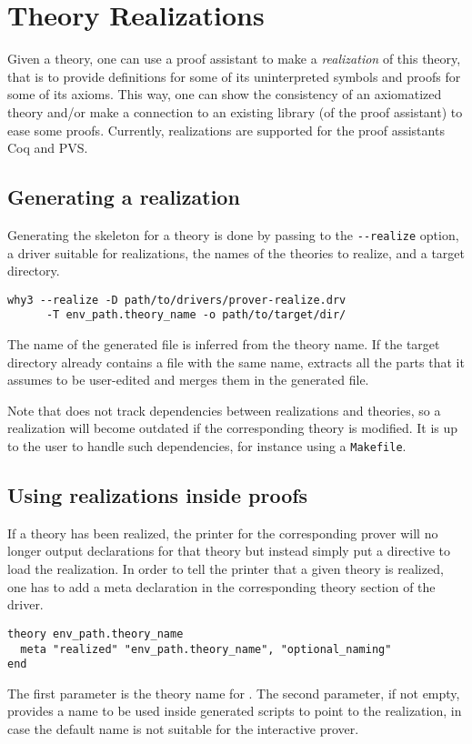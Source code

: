 \chapter{Theory Realizations}
\label{chap:realizations}

Given a \why theory, one can use a proof assistant to make a
\emph{realization} of this theory, that is to provide definitions for
some of its uninterpreted symbols and proofs for some of its
axioms. This way, one can show the consistency of an axiomatized
theory and/or make a connection to an existing library (of the proof
assistant) to ease some proofs.
Currently, realizations are supported for the proof assistants Coq and PVS.

\section{Generating a realization}

Generating the skeleton for a theory is done by passing to \why the
\verb+--realize+ option, a driver suitable for realizations, the names of
the theories to realize, and a target directory.

\begin{verbatim}
why3 --realize -D path/to/drivers/prover-realize.drv
      -T env_path.theory_name -o path/to/target/dir/
\end{verbatim}
The name of the generated file is inferred from the theory name. If the
target directory already contains a file with the same name, \why
extracts all the parts that it assumes to be user-edited and merges them in
the generated file.

Note that \why does not track dependencies between realizations and
theories, so a realization will become outdated if the corresponding
theory is modified.
It is up to the user to handle such dependencies, for instance using a
\texttt{Makefile}.

\section{Using realizations inside proofs}

If a theory has been realized, the \why printer for the corresponding prover
will no longer output declarations for that theory but instead simply put
a directive to load the realization. In order to tell the printer
that a given theory is realized, one has to add a meta declaration in the
corresponding theory section of the driver.
\begin{verbatim}
theory env_path.theory_name
  meta "realized" "env_path.theory_name", "optional_naming"
end
\end{verbatim}
The first parameter is the theory name for \why. The second
parameter, if not empty, provides a name to be used inside generated
scripts to point to the realization, in case the default name is not
suitable for the interactive prover.

